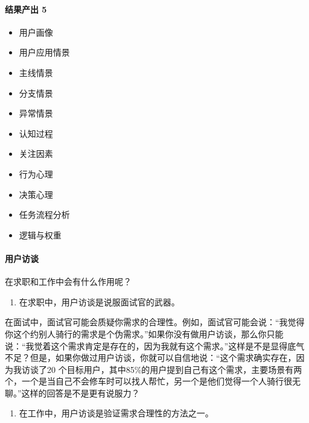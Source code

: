 \documentclass[letterpaper,11pt,english]{sphinxmanual}
\begin{document}
\paragraph{结果产出 5\sphinxfootnotemark[163]}
\label{\detokenize{chapter_skill/users_analysis:id23}}%
\begin{footnotetext}[163]\sphinxAtStartFootnote
{}
%
\end{footnotetext}\ignorespaces \begin{itemize}
\item {} 
用户画像

\item {} 
用户应用情景

\item {} 
主线情景

\item {} 
分支情景

\item {} 
异常情景

\item {} 
认知过程

\item {} 
关注因素

\item {} 
行为心理

\item {} 
决策心理

\item {} 
任务流程分析

\item {} 
逻辑与权重

\end{itemize}


\paragraph{用户访谈}
\label{\detokenize{chapter_skill/users_analysis:id24}}
在求职和工作中会有什么作用呢？
\begin{enumerate}
%
\item {} 
在求职中，用户访谈是说服面试官的武器。

\end{enumerate}

在面试中，面试官可能会质疑你需求的合理性。例如，面试官可能会说：“我觉得你这个约别人骑行的需求是个伪需求。”如果你没有做用户访谈，那么你只能说：“我觉着这个需求肯定是存在的，因为我就有这个需求。”这样是不是显得底气不足？但是，如果你做过用户访谈，你就可以自信地说：“这个需求确实存在，因为我访谈了20
个目标用户，其中85\%的用户提到自己有这个需求，主要场景有两个，一个是当自己不会修车时可以找人帮忙，另一个是他们觉得一个人骑行很无聊。”这样的回答是不是更有说服力？
\begin{enumerate}
%
\setcounter{enumi}{1}
\item {} 
在工作中，用户访谈是验证需求合理性的方法之一。

\end{enumerate}
\end{document}
